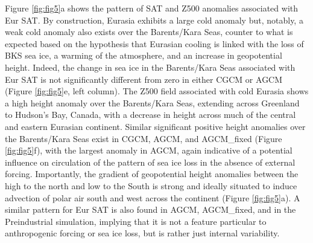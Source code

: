 \documentclass{nature}
\begin{document}

Figure \ref{fig:fig5}a shows the pattern of SAT and Z500 anomalies associated with Eur SAT. By construction, Eurasia exhibits a large cold anomaly but, notably, a weak cold anomaly also exists over the Barents/Kara Seas, counter to what is expected based on the hypothesis that Eurasian cooling is linked with the loss of BKS sea ice, a warming of the atmosphere, and an increase in geopotential height. Indeed, the change in sea ice in the Barents/Kara Seas associated with Eur SAT is not significantly different from zero in either CGCM or AGCM (Figure \ref{fig:fig5}e, left column). The Z500 field associated with cold Eurasia shows a high height anomaly over the Barents/Kara Seas, extending across Greenland to Hudson's Bay, Canada, with a decrease in height across much of the central and eastern Eurasian continent. Similar significant positive height anomalies over the Barents/Kara Seas exist in CGCM, AGCM, and AGCM\_fixed (Figure \ref{fig:fig5}f), with the largest anomaly in AGCM, again indicative of a potential influence on circulation of the pattern of sea ice loss in the absence of external forcing. Importantly, the gradient of geopotential height anomalies between the high to the north and low to the South is strong and ideally situated to induce advection of polar air south and west across the continent (Figure \ref{fig:fig5}a). A similar pattern for Eur SAT is also found in AGCM, AGCM\_fixed, and in the Preindustrial simulation, implying that it is not a feature particular to anthropogenic forcing or sea ice loss, but is rather just internal variability.
\end{document}
